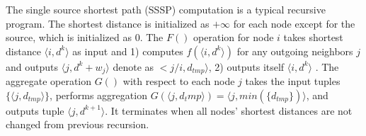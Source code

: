 {\color{red}
 The single source shortest path (SSSP) computation is a typical recursive program. The shortest distance is initialized as $+\infty$ for each node except for the source, which is initialized as 0. The $F()$ operation for node $i$  takes  shortest distance $\langle i, d^k\rangle$ as input and 1) computes $f(\langle i, d^k\rangle)$ for any outgoing neighbors $j$ and outputs $\langle j, d^k+w_j\rangle$ denote as $<j/i,d_{tmp}\rangle$, 2) outputs itself $\langle  i,d^k\rangle$ . The aggregate operation $G()$ with respect to each node $j$ takes the input tuples $\{\langle j,d_{tmp}\rangle\}$, performs aggregation $G(\langle j,d_tmp \rangle)=\langle j, min(\{d_{tmp}\})\rangle$, and outputs tuple $\langle j,d^{k+1}\rangle$. It terminates when all nodes' shortest distances are not changed from previous recursion.
}
